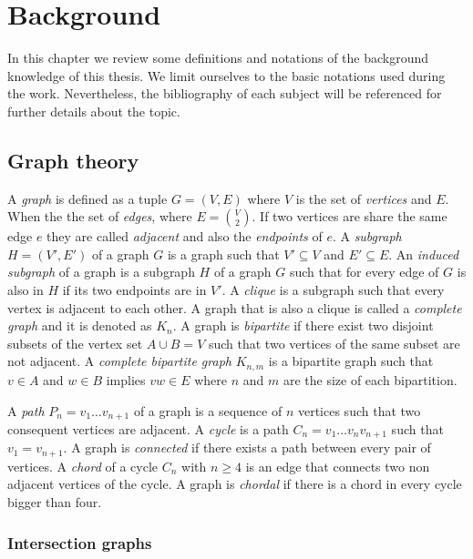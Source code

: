 \chapter{Background}
\label{chap:background}

In this chapter we review some definitions and notations of the background knowledge of this thesis. We limit ourselves to the basic notations used during the work. Nevertheless, the bibliography of each subject will be referenced for further details about the topic.


%
%
%

\section{Graph theory}

A \emph{graph} is defined as a tuple $G = (V,E)$ where $V$ is the set of \emph{vertices} and $E$. When the the set of \emph{edges}, where $E = \binom{V}{2}$. If two vertices are share the same edge $e$ they are called \emph{adjacent} and also the \emph{endpoints} of $e$. A \emph{subgraph} $H = (V', E')$ of a graph $G$ is a graph such that $V' \subseteq V$ and $E' \subseteq E$. An \emph{induced subgraph} of a graph is a subgraph $H$ of a graph $G$ such that for every edge of $G$ is also in $H$ if its two endpoints are in $V'$. A \emph{clique} is a subgraph such that every vertex is adjacent to each other. A graph that is also a clique is called a \emph{complete graph} and it is denoted as $K_n$. A graph is \emph{bipartite} if there exist two disjoint subsets of the vertex set $A \cup B = V$ such that two vertices of the same subset are not adjacent. A \emph{complete bipartite graph} $K_{n,m}$ is a bipartite graph such that $v \in A$ and $w \in B$ implies $vw \in E$ where $n$ and $m$ are the size of each bipartition.

A \emph{path} $P_n = v_1\dots v_{n+1}$ of a graph is a sequence of $n$ vertices such that two consequent vertices are adjacent. A \emph{cycle} is a path $C_n = v_1\dots v_nv_{n+1}$ such that $v_1=v_{n+1}$. A graph is \emph{connected} if there exists a path between every pair of vertices. A \emph{chord} of a cycle $C_n$ with $n \geqslant 4$ is an edge that connects two non adjacent vertices of the cycle. A graph is \emph{chordal} if there is a chord in every cycle bigger than four.

\subsection{Intersection graphs}

